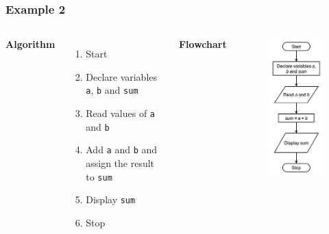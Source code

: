 \documentclass{beamer}
\begin{document}
\begin{frame}[fragile]
    \frametitle{Example 2}
    \begin{columns}
    \textbf{Algorithm}
    \begin{enumerate}
        \item Start
        \item Declare variables \texttt{a}, \texttt{b} and \texttt{sum}
        \item Read values of \texttt{a} and \texttt{b}
        \item Add \texttt{a} and \texttt{b} and assign the result to \texttt{sum}
        \item Display \texttt{sum}
        \item Stop
    \end{enumerate}
    \textbf{Flowchart}
    \begin{figure}
        \centering
        \includegraphics[scale=0.55]{p2flow}
    \end{figure}
    \end{columns}
\end{frame}
\end{document}
